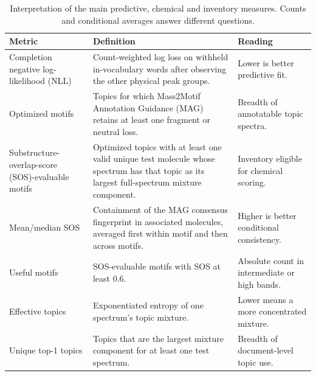 \documentclass[10pt,a4paper]{article}
\begin{document}
\begin{table}[H]
\centering
\small
\begin{tabular}{@{}>{\raggedright\arraybackslash}p{}
>{\raggedright\arraybackslash}p{}
>{\raggedright\arraybackslash}p{}@{}}
\toprule
Metric & Definition & Reading \\
\midrule
Completion negative log-likelihood (NLL) &
Count-weighted log loss on withheld in-vocabulary words after observing the
other physical peak groups. &
Lower is better predictive fit. \\
Optimized motifs &
Topics for which Mass2Motif Annotation Guidance (MAG) retains at least one
fragment or neutral loss. &
Breadth of annotatable topic spectra. \\
Substructure-overlap-score (SOS)-evaluable motifs &
Optimized topics with at least one valid unique test molecule whose spectrum has
that topic as its largest full-spectrum mixture component. &
Inventory eligible for chemical scoring. \\
Mean/median SOS &
Containment of the MAG consensus fingerprint in associated molecules, averaged
first within motif and then across motifs. &
Higher is better conditional consistency. \\
Useful motifs &
SOS-evaluable motifs with SOS at least 0.6. &
Absolute count in intermediate or high bands. \\
Effective topics &
Exponentiated entropy of one spectrum's topic mixture. &
Lower means a more concentrated mixture. \\
Unique top-1 topics &
Topics that are the largest mixture component for at least one test
spectrum. &
Breadth of document-level topic use. \\
\bottomrule
\end{tabular}
\caption{Interpretation of the main predictive, chemical and inventory
measures. Counts and conditional averages answer different questions.}
\label{tab:metric-interpretation}
\end{table}
\end{document}
